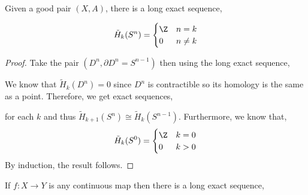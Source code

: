\documentclass[12pt]{extarticle}
\begin{document}
\begin{corollary}
Given a good pair $(X, A)$, there is a long exact sequence,
\begin{center}
\end{center} 
\end{corollary}

\begin{theorem}
\[\tilde{H}_k(S^n) =
\begin{cases}
\Z & n = k \\
0 & n \neq k
\end{cases}\]
\end{theorem}

\begin{proof}
Take the pair $(D^n, \partial D^n = S^{n-1})$ then using the long exact sequence,
\begin{center}
\end{center} 
We know that $\tilde{H}_k(D^n) = 0$ since $D^n$ is contractible so its homology is the same as a point. Therefore, we get exact sequences,
\begin{center}
\end{center} 
for each $k$ and thus $\tilde{H}_{k+1}(S^n) \cong \tilde{H}_k(S^{n-1})$. Furthermore, we know that,
\[ \tilde{H}_k(S^0) = 
\begin{cases}
\Z & k = 0 \\
0 & k > 0 
\end{cases}\]
By induction, the result follows.
\end{proof}

\begin{theorem}
If $f : X \to Y$ is any continuous map then there is a long exact sequence,
\begin{center}
\end{center}
\end{theorem}
\end{document}
